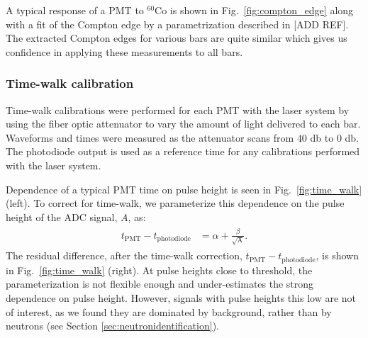 \documentclass[3p,final,twocolumn]{elsarticle}
\begin{document}
A typical response of a PMT to $^{60}$Co is shown in
Fig.~\ref{fig:compton_edge} along with a fit of the Compton edge by a
parametrization described in [ADD REF]. The extracted Compton edges
for various bars are quite similar which gives us confidence in
applying these measurements to all bars. 



\subsubsection{Time-walk calibration}
Time-walk calibrations were performed for each PMT with the laser system
\cite{band-laser} by using the fiber optic attenuator \cite{attenuator} to vary
the amount of light delivered to each bar. Waveforms and times were measured as the attenuator scans from $40$ \si{\decibel} to $0$ 
\si{\decibel}. The photodiode output is used as a reference time for any calibrations 
performed with the laser system.

Dependence of a typical PMT time on pulse height is seen in
Fig.~\ref{fig:time_walk} (left). To correct for time-walk, we
parameterize this dependence on the pulse height of the ADC signal, $A$,
as:
\begin{eqnarray}
	\begin{split}
		t_{\mathrm{PMT}}-t_{\mathrm{photodiode}}	&= \alpha + \frac{\beta}{\sqrt{\textrm{A}}}.				
		\label{eqn:time_walk}
	\end{split}
\end{eqnarray}
The residual difference, after the time-walk correction,
$t_{\mathrm{PMT}}-t_{\mathrm{photodiode}}$, is shown in
Fig.~\ref{fig:time_walk} (right). At pulse heights close to threshold,
the parameterization is not flexible enough and under-estimates the
strong dependence on pulse height. However, signals with pulse heights
this low are not of interest, as we found they are dominated by background,
rather than by neutrons  (see Section \ref{sec:neutronidentification}).
\end{document}
